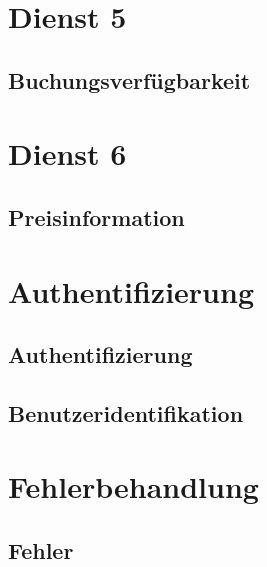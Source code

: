 \section{Dienst 5}
\label{subsec:Datenmodell:Dienst5}

\subsection*{Buchungsverfügbarkeit}



\section{Dienst 6}
\label{subsec:Datenmodell:Dienst6}

\subsection*{Preisinformation}




\section{Authentifizierung}
\subsection*{Authentifizierung}


\subsection*{Benutzeridentifikation}



\section{Fehlerbehandlung}
\subsection*{Fehler}



